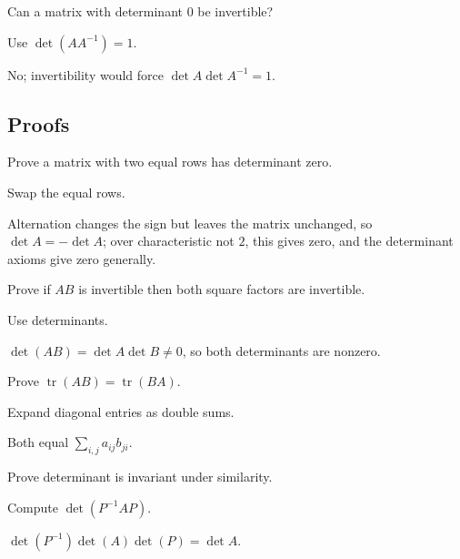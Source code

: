 \begin{exercise}[Invertibility]\label{exr:i08-expand-05}
Can a matrix with determinant \(0\) be invertible?
\end{exercise}
\begin{hint}
Use \(\det(AA^{-1})=1\).
\end{hint}
\begin{solution}
No; invertibility would force \(\det A\det A^{-1}=1\).
\end{solution}

\subsection*{Proofs}

\begin{exercise}\label{exr:i08-expand-06}
Prove a matrix with two equal rows has determinant zero.
\end{exercise}
\begin{hint}
Swap the equal rows.
\end{hint}
\begin{solution}
Alternation changes the sign but leaves the matrix unchanged, so \(\det A=-\det A\); over characteristic not \(2\), this gives zero, and the determinant axioms give zero generally.
\end{solution}

\begin{exercise}\label{exr:i08-expand-07}
Prove if \(AB\) is invertible then both square factors are invertible.
\end{exercise}
\begin{hint}
Use determinants.
\end{hint}
\begin{solution}
\(\det(AB)=\det A\det B\neq0\), so both determinants are nonzero.
\end{solution}

\begin{exercise}\label{exr:i08-expand-08}
Prove \(\operatorname{tr}(AB)=\operatorname{tr}(BA)\).
\end{exercise}
\begin{hint}
Expand diagonal entries as double sums.
\end{hint}
\begin{solution}
Both equal \(\sum_{i,j}a_{ij}b_{ji}\).
\end{solution}

\begin{exercise}\label{exr:i08-expand-09}
Prove determinant is invariant under similarity.
\end{exercise}
\begin{hint}
Compute \(\det(P^{-1}AP)\).
\end{hint}
\begin{solution}
\(\det(P^{-1})\det(A)\det(P)=\det A\).
\end{solution}

